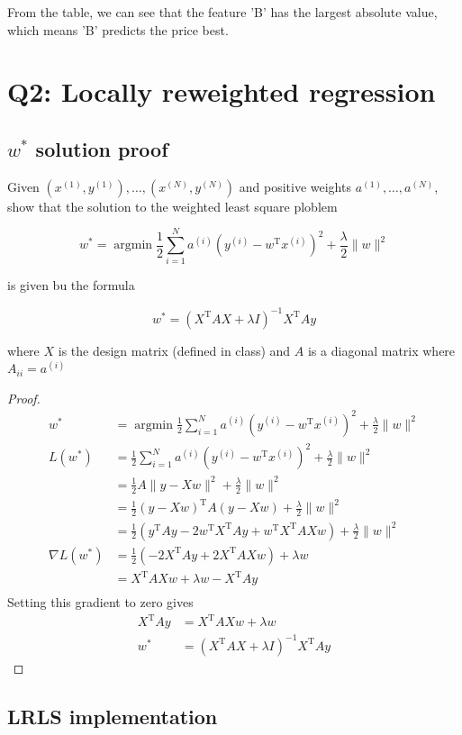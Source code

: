 \documentclass[a4paper]{article}
\begin{document}
From the table, we can see that the feature 'B' has the largest absolute value, which means 'B' predicts the price best.

\section{Q2: Locally reweighted regression}

\subsection{$w^*$ solution proof}

Given $(x^{(1)}, y^{(1)}), \dots, (x^{(N)}, y^{(N)})$ and positive weights $a^{(1)}, \dots, a^{(N)}$, show that the solution to the weighted least square ploblem

\begin{equation}
w^*=\operatorname{argmin}\frac{1}{2}\sum_{i=1}^Na^{(i)}(y^{(i)}-w^\mathrm{T}x^{(i)})^2+\frac{\lambda}{2}\|w\|^2
\end{equation}

is given bu the formula

\begin{equation}
w^*=(X^\mathrm{T}AX+\lambda I)^{-1}X^\mathrm{T}Ay
\end{equation}

where $X$ is the design matrix (defined in class) and $A$ is a diagonal matrix where $A_{ii}=a^{(i)}$

\begin{proof}
    \begin{align*}
        w^*&=\operatorname{argmin}\frac{1}{2}\sum_{i=1}^Na^{(i)}(y^{(i)}-w^\mathrm{T}x^{(i)})^2+\frac{\lambda}{2}\|w\|^2\\
        L(w^*)&=\frac{1}{2}\sum_{i=1}^Na^{(i)}(y^{(i)}-w^\mathrm{T}x^{(i)})^2+\frac{\lambda}{2}\|w\|^2\\
        &=\frac{1}{2}A\|y-Xw\|^2+\frac{\lambda}{2}\|w\|^2\\
        &=\frac{1}{2}(y-Xw)^\mathrm{T}A(y-Xw)+\frac{\lambda}{2}\|w\|^2\\
        &=\frac{1}{2}(y^\mathrm{T}Ay-2w^\mathrm{T}X^\mathrm{T}Ay+w^\mathrm{T}X^\mathrm{T}AXw)+\frac{\lambda}{2}\|w\|^2\\
        \nabla L(w^*)&=\frac{1}{2}(-2X^\mathrm{T}Ay+2X^\mathrm{T}AXw)+\lambda w\\
        &=X^\mathrm{T}AXw+\lambda w-X^\mathrm{T}Ay\\
    \end{align*}
    \qquad Setting this gradient to zero gives\\
    \begin{align*}
        X^\mathrm{T}Ay&=X^\mathrm{T}AXw+\lambda w\\
        w^*&=(X^\mathrm{T}AX+\lambda I)^{-1}X^\mathrm{T}Ay
    \end{align*}
\end{proof}

\subsection{LRLS implementation}




\end{document}
